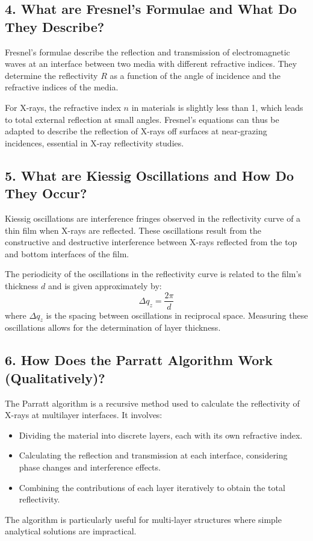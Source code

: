 \documentclass[a4paper,12pt]{article}
\begin{document}
\subsection*{4. What are Fresnel’s Formulae and What Do They Describe?}
Fresnel’s formulae describe the reflection and transmission of electromagnetic waves at an interface between two media with different refractive indices. They determine the reflectivity \( R \) as a function of the angle of incidence and the refractive indices of the media.

For X-rays, the refractive index \( n \) in materials is slightly less than 1, which leads to total external reflection at small angles. Fresnel’s equations can thus be adapted to describe the reflection of X-rays off surfaces at near-grazing incidences, essential in X-ray reflectivity studies.

\subsection*{5. What are Kiessig Oscillations and How Do They Occur?}
Kiessig oscillations are interference fringes observed in the reflectivity curve of a thin film when X-rays are reflected. These oscillations result from the constructive and destructive interference between X-rays reflected from the top and bottom interfaces of the film.

The periodicity of the oscillations in the reflectivity curve is related to the film's thickness \( d \) and is given approximately by:
\[
\Delta q_z = \frac{2\pi}{d}
\]
where \( \Delta q_z \) is the spacing between oscillations in reciprocal space. Measuring these oscillations allows for the determination of layer thickness.

\subsection*{6. How Does the Parratt Algorithm Work (Qualitatively)?}
The Parratt algorithm is a recursive method used to calculate the reflectivity of X-rays at multilayer interfaces. It involves:
\begin{itemize}
    \item Dividing the material into discrete layers, each with its own refractive index.
    \item Calculating the reflection and transmission at each interface, considering phase changes and interference effects.
    \item Combining the contributions of each layer iteratively to obtain the total reflectivity.
\end{itemize}
The algorithm is particularly useful for multi-layer structures where simple analytical solutions are impractical.
\end{document}
